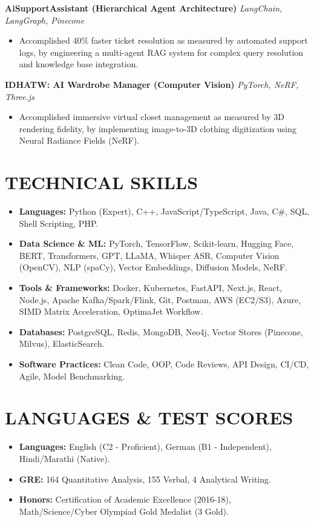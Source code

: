 \documentclass[10pt, a4paper]{article}
\begin{document}
\textbf{AiSupportAssistant (Hierarchical Agent Architecture)} \hfill \textit{LangChain, LangGraph, Pinecone}
\begin{itemize}
    \item Accomplished 40\% faster ticket resolution as measured by automated support logs, by engineering a multi-agent RAG system for complex query resolution and knowledge base integration.
\end{itemize}

\textbf{IDHATW: AI Wardrobe Manager (Computer Vision)} \hfill \textit{PyTorch, NeRF, Three.js}
\begin{itemize}
    \item Accomplished immersive virtual closet management as measured by 3D rendering fidelity, by implementing image-to-3D clothing digitization using Neural Radiance Fields (NeRF).
\end{itemize}

\section{TECHNICAL SKILLS}
\begin{itemize}
    \item \textbf{Languages:} Python (Expert), C++, JavaScript/TypeScript, Java, C\#, SQL, Shell Scripting, PHP.
    \item \textbf{Data Science \& ML:} PyTorch, TensorFlow, Scikit-learn, Hugging Face, BERT, Transformers, GPT, LLaMA, Whisper ASR, Computer Vision (OpenCV), NLP (spaCy), Vector Embeddings, Diffusion Models, NeRF.
    \item \textbf{Tools \& Frameworks:} Docker, Kubernetes, FastAPI, Next.js, React, Node.js, Apache Kafka/Spark/Flink, Git, Postman, AWS (EC2/S3), Azure, SIMD Matrix Acceleration, OptimaJet Workflow.
    \item \textbf{Databases:} PostgreSQL, Redis, MongoDB, Neo4j, Vector Stores (Pinecone, Milvus), ElasticSearch.
    \item \textbf{Software Practices:} Clean Code, OOP, Code Reviews, API Design, CI/CD, Agile, Model Benchmarking.
\end{itemize}

\section{LANGUAGES \& TEST SCORES}
\begin{itemize}
    \item \textbf{Languages:} English (C2 - Proficient), German (B1 - Independent), Hindi/Marathi (Native).
    \item \textbf{GRE:} 164 Quantitative Analysis, 155 Verbal, 4 Analytical Writing.
    \item \textbf{Honors:} Certification of Academic Excellence (2016-18), Math/Science/Cyber Olympiad Gold Medalist (3 Gold).
\end{itemize}
\end{document}

